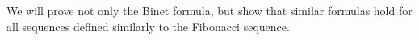 

\setcounter{section}{1}
\setcounter{subsection}{2}
\setcounter{dfn}{1}

We will prove not only the Binet formula, but show that similar formulas hold for all sequences defined similarly to the Fibonacci sequence.



